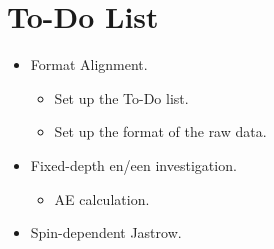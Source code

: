 \section*{To-Do List}
\newcommand{\done}{\item[$\checkmark$]}
\newcommand{\todo}{\item[$\square$]}

\begin{itemize}
    \item Format Alignment.
    \begin{itemize}
        \done Set up the To-Do list.
        \todo Set up the format of the raw data. 
    \end{itemize}
    \item Fixed-depth en/een investigation.
    \begin{itemize}
        \todo AE calculation.
    \end{itemize}
    \item Spin-dependent Jastrow.
\end{itemize}
